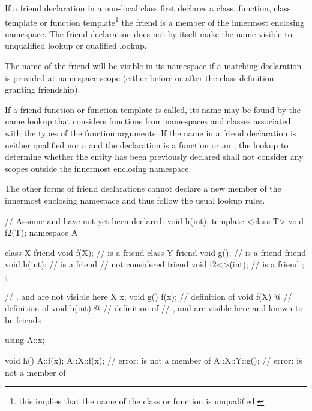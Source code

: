 \pnum
If a friend declaration in a non-local class first declares a
class, function, class template or function template\footnote{this implies that the name of the class or function is unqualified.}
the friend is a member of the innermost enclosing
namespace. The friend declaration does not by itself make the name
visible to unqualified lookup or qualified
lookup. \begin{note} The name of the friend will be
visible in its namespace if a matching declaration is provided at namespace
scope (either before or after the class definition granting friendship).
\end{note} If a friend
function or function template is called, its name may be found by the
name lookup that considers functions from namespaces and classes
associated with the types of the function
arguments. If the
name in a friend declaration is neither qualified nor a
 and the declaration is a function or an
, the lookup to determine whether
the entity has been previously declared shall not consider any scopes
outside the innermost enclosing namespace. \begin{note} The other forms of
friend declarations cannot declare a new member of the innermost
enclosing namespace and thus follow the usual lookup rules.
\end{note}
\begin{example}

\begin{codeblock}
// Assume  and  have not yet been declared.
void h(int);
template <class T> void f2(T);
namespace A {
  class X {
    friend void f(X);           //  is a friend
    class Y {
      friend void g();          //  is a friend
      friend void h(int);       //  is a friend
                                //  not considered
      friend void f2<>(int);    //  is a friend
    };
  };

  // ,  and  are not visible here
  X x;
  void g() { f(x); }            // definition of 
  void f(X) { @\commentellip@ }       // definition of 
  void h(int) { @\commentellip@ }     // definition of 
  // ,  and  are visible here and known to be friends
}

using A::x;

void h() {
  A::f(x);
  A::X::f(x);                   // error:  is not a member of 
  A::X::Y::g();                 // error:  is not a member of 
}
\end{codeblock}
\end{example}

